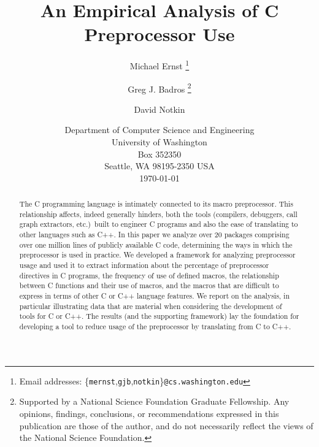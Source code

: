 \documentclass[11pt]{article}
\begin{document}
% 


\title{An Empirical Analysis of C Preprocessor Use}

\author{Michael Ernst%
  \thanks{Email addresses: \{{\tt mernst},{\tt gjb},{\tt notkin}\}{\tt @cs.washington.edu}}
  \and Greg J. Badros%
  \thanks{Supported by a National Science Foundation
    Graduate Fellowship. Any opinions, findings, conclusions, or
    recommendations expressed in this publication are those of the
    author, and do not necessarily reflect the views of the National
    Science Foundation.}
  \and David Notkin}

\date{Department of Computer
Science and Engineering\\
University of Washington\\
Box 352350\\
Seattle, WA  98195-2350  USA\\
\today}  

\maketitle

\begin{abstract}

  The C programming language is intimately connected to its macro
  preprocessor.  This relationship affects, indeed generally hinders,
  both the tools (compilers, debuggers, call graph extractors, etc.)\ 
  built to engineer C programs and also the ease of translating to other
  languages such as C++.  In this paper we analyze over 20 packages
  comprising over one million lines of publicly available C code,
  determining the ways in which the preprocessor is used in practice.
  We developed a framework for analyzing preprocessor usage and used it to
  extract information about the percentage of preprocessor directives in
  C programs, the frequency of use of defined macros, the relationship
  between C functions and their use of macros, and the macros that are
  difficult to express in terms of other C or C++ language features.  We
  report on the analysis, in particular illustrating data that are
  material when considering the development of tools for C or C++.  The
  results (and the supporting framework) lay the foundation for
  developing a tool to reduce usage of the preprocessor by translating
  from C to C++.

\end{abstract}

\bigskip
\end{document}

